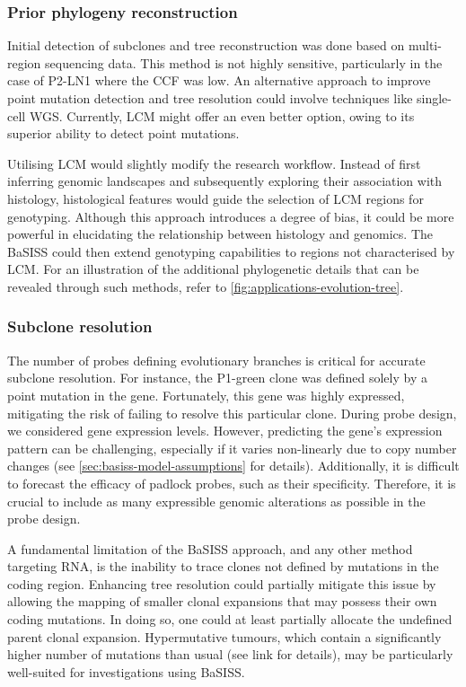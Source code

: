 \subsubsection*{Prior phylogeny reconstruction}
Initial detection of subclones and tree reconstruction was done based on multi-region sequencing data. This method is not highly sensitive, particularly in the case of P2-LN1 where the \ac{CCF} was low. An alternative approach to improve point mutation detection and tree resolution could involve techniques like single-cell \ac{WGS}. Currently, \ac{LCM} might offer an even better option, owing to its superior ability to detect point mutations.

Utilising \ac{LCM} would slightly modify the research workflow. Instead of first inferring genomic landscapes and subsequently exploring their association with histology, histological features would guide the selection of \ac{LCM} regions for genotyping. Although this approach introduces a degree of bias, it could be more powerful in elucidating the relationship between histology and genomics. The \ac{BaSISS} could then extend genotyping capabilities to regions not characterised by \ac{LCM}. For an illustration of the additional phylogenetic details that can be revealed through such methods, refer to \cref{fig:applications-evolution-tree}.

\subsubsection*{Subclone resolution}
The number of probes defining evolutionary branches is critical for accurate subclone resolution. For instance, the P1-green clone was defined solely by a point mutation in the  gene. Fortunately, this gene was highly expressed, mitigating the risk of failing to resolve this particular clone. During probe design, we considered gene expression levels. However, predicting the gene's expression pattern can be challenging, especially if it varies non-linearly due to copy number changes (see \cref{sec:basiss-model-assumptions} for details). Additionally, it is difficult to forecast the efficacy of padlock probes, such as their specificity. Therefore, it is crucial to include as many expressible genomic alterations as possible in the probe design.

A fundamental limitation of the \ac{BaSISS} approach, and any other method targeting RNA, is the inability to trace clones not defined by mutations in the coding region. Enhancing tree resolution could partially mitigate this issue by allowing the mapping of smaller clonal expansions that may possess their own coding mutations. In doing so, one could at least partially allocate the undefined parent clonal expansion. Hypermutative tumours, which contain a significantly higher number of mutations than usual (see link for details), may be particularly well-suited for investigations using \ac{BaSISS}.

